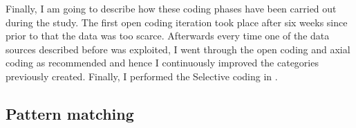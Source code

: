 Finally, I am going to describe how these coding phases have been carried out during the study. The first open coding iteration took place after six weeks since prior to that the data was too scarce. Afterwards every time one of the data sources described before was exploited, I went through the open coding and axial coding as recommended and hence  I continuously improved the categories previously created. Finally, I performed the Selective coding in .


\subsection{Pattern matching}